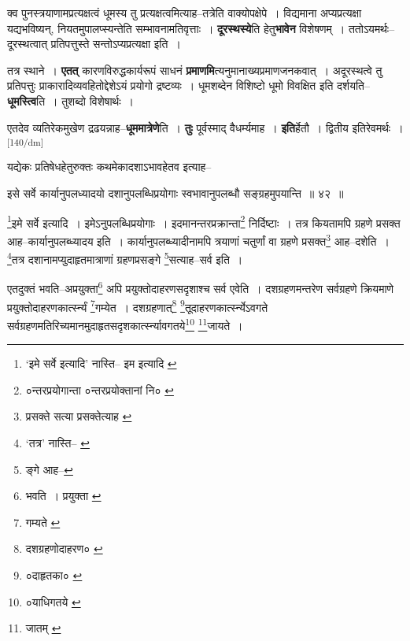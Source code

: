 \documentclass[article,12pt,a4paper]{memoir}
\begin{document}
	  \pstart क्व पुनस्त्रयाणामप्रत्यक्षत्वं धूमस्य तु प्रत्यक्षत्वमित्याह--तत्रेति वाक्योपक्षेपे । विद्यमाना अप्यप्रत्यक्षा यद्यभविष्यन्, नियतमुपालप्स्यन्तेति सम्भावनामतिवृत्ताः । \textbf{दूरस्थस्ये}ति हेतु\textbf{भावेन} विशेषणम् । ततोऽयमर्थः--दूरस्थत्वात् प्रतिपत्तुस्ते सन्तोऽप्यप्रत्यक्षा इति ।
	\pend
      

	  \pstart तत्र स्थाने । \textbf{एतत्} कारणविरुद्धकार्यरूपं साधनं \textbf{प्रमाणमि}त्यनुमानाख्यप्रमाणजनकवात् । अदूरस्थत्वे तु प्रतिपत्तुः प्राकारादिव्यवहितोद्देशेऽयं प्रयोगो द्रष्टव्यः । धूमशब्देन विशिष्टो धूमो विवक्षित इति दर्शयति--\textbf{धूमस्त्वि}ति । तुशब्दो विशेषार्थः ।
	\pend
      

	  \pstart एतदेव व्यतिरेकमुखेण द्रढयन्नाह--\textbf{धूममात्रेणे}ति । \textbf{तुः} पूर्वस्माद् वैधर्म्यमाह । \textbf{इति}र्हेतौ । द्वितीय इतिरेवमर्थः ।
	\pend
      \leavevmode\textsuperscript{\rmlatinfont\tiny [140/dm]}

	  \pstart यद्येकः प्रतिषेधहेतुरुक्तः कथमेकादशाऽभावहेतव इत्याह--
	\pend
       

	  \pstart इसे सर्वे कार्यानुपलध्यादयो दशानुपलब्धिप्रयोगाः स्वभावानुपलब्धौ सङ्ग्रहमुपयान्ति ॥ ४२ ॥
	\pend
       

	  \pstart \footnote{‘इमे सर्वे इत्यादि’ नास्ति--\cite{dp-edH} \cite{dp-edN} इम इत्यादि \cite{dp-msA} \cite{dp-msB} \cite{dp-msD} \cite{dp-edE} \cite{dp-edP}}इमे सर्वे इत्यादि । इमेऽनुपलब्धिप्रयोगाः । इदमानन्तरप्रक्रान्ता\footnote{०न्तरप्रयोगान्ता \cite{dp-edH} \cite{dp-edE} ०न्तरप्रयोक्तानां नि० \cite{dp-msA}} निर्दिष्टाः । तत्र कियतामपि ग्रहणे प्रसक्त आह--कार्यानुपलब्ध्यादय इति । कार्यानुपलब्ध्यादीनामपि त्रयाणां चतुर्णां वा ग्रहणे प्रसक्त\footnote{प्रसक्ते सत्या \cite{dp-edP} \cite{dp-edH} \cite{dp-edE} \cite{dp-edN} प्रसक्तेत्याह \cite{dp-msA}} आह--दशेति । \footnote{‘तत्र’ नास्ति--\cite{dp-msA} \cite{dp-msB} \cite{dp-edP} \cite{dp-edH} \cite{dp-edE} \cite{dp-edN}}तत्र दशानामप्युदाहृतमात्राणां ग्रहणप्रसङ्गे \footnote{ङ्गे आह--\cite{dp-msB}}सत्याह--सर्व इति ।
	\pend
       

	  \pstart एतदुक्तं भवति--अप्रयुक्ता\footnote{भवति । प्रयुक्ता \cite{dp-msC}} अपि प्रयुक्तोदाहरणसदृशाश्च सर्व एवेति । दशग्रहणमन्तरेण सर्वग्रहणे क्रियमाणे प्रयुक्तोदाहरणकार्त्स्न्यं \footnote{गम्यते \cite{dp-msA} \cite{dp-msB} \cite{dp-msC} \cite{dp-msD} \cite{dp-edP} \cite{dp-edH} \cite{dp-edE} \cite{dp-edN}}गम्येत । दशग्रहणात्\footnote{दशग्रहणोदाहरण० \cite{dp-msB}} \footnote{०दाहृतका० \cite{dp-msC}}तूदाहरणकार्त्स्न्येऽवगते सर्वग्रहणमतिरिच्यमानमुदाहृतसदृशकार्त्स्न्यावगतये\footnote{०याधिगतये \cite{dp-msC}} \footnote{जातम् \cite{dp-edE}}जायते ।
	\pend
      
\end{document}
